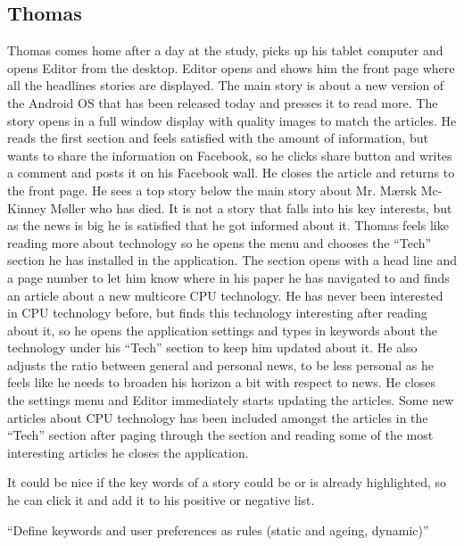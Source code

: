 \subsection{Thomas}
Thomas comes home after a day at the study, picks up his tablet computer and opens Editor from the desktop. Editor opens and shows him the front page where all the headlines stories are displayed. The main story is about a new version of the Android OS that has been released today and presses it to read more. The story opens in a full window display with quality images to match the articles. He reads the first section and feels satisfied with the amount of information, but wants to share the information on Facebook, so he clicks share button and writes a comment and posts it on his Facebook wall. He closes the article and returns to the front page. He sees a top story below the main story about Mr. Mærsk Mc-Kinney Møller who has died. It is not a story that falls into his key interests, but as the news is big he is satisfied that he got informed about it. Thomas feels like reading more about technology so he opens the menu and chooses the ``Tech'' section he has installed in the application. The section opens with a head line and a page number to let him know where in his paper he has navigated to and finds an article about a new multicore CPU technology. He has never been interested in CPU technology before, but finds this technology interesting after reading about it, so he opens the application settings and types in keywords about the technology under his ``Tech'' section to keep him updated about it. He also adjusts the ratio between general and personal news, to be less personal as he feels like he needs to broaden his horizon a bit with respect to news. He closes the settings menu and Editor immediately starts updating the articles. Some new articles about CPU technology has been included amongst the articles in the ``Tech'' section after paging through the section and reading some of the most interesting articles he closes the application.

It could be nice if the key words of a story could be or is already highlighted, so he can click it and add it to his positive or negative list.

``Define keywords and user preferences as rules (static and ageing, dynamic)'' \cite{Personalizing-your-electronic-newspaper.pdf}

